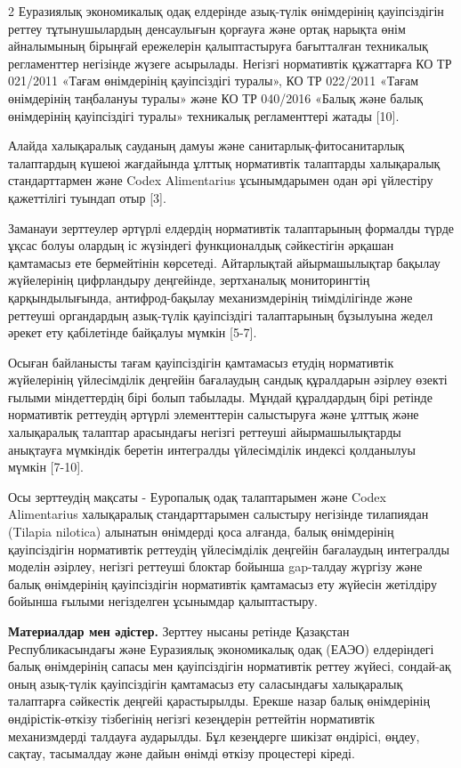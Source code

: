 \begin{multicols}{2}
Еуразиялық экономикалық одақ елдерінде азық-түлік өнімдерінің
қауіпсіздігін реттеу тұтынушылардың денсаулығын қорғауға және ортақ
нарықта өнім айналымының бірыңғай ережелерін қалыптастыруға бағытталған
техникалық регламенттер негізінде жүзеге асырылады. Негізгі нормативтік
құжаттарға КО ТР 021/2011 «Тағам өнімдерінің қауіпсіздігі туралы», КО ТР
022/2011 «Тағам өнімдерінің таңбалануы туралы» және КО ТР 040/2016
«Балық және балық өнімдерінің қауіпсіздігі туралы» техникалық
регламенттері жатады {[}10{]}.

Алайда халықаралық сауданың дамуы және санитарлық-фитосанитарлық
талаптардың күшеюі жағдайында ұлттық нормативтік талаптарды халықаралық
стандарттармен және Codex Alimentarius ұсынымдарымен одан әрі үйлестіру
қажеттілігі туындап отыр {[}3{]}.

Заманауи зерттеулер әртүрлі елдердің нормативтік талаптарының формалды
түрде ұқсас болуы олардың іс жүзіндегі функционалдық сәйкестігін әрқашан
қамтамасыз ете бермейтінін көрсетеді. Айтарлықтай айырмашылықтар бақылау
жүйелерінің цифрландыру деңгейінде, зертханалық мониторингтің
қарқындылығында, антифрод-бақылау механизмдерінің тиімділігінде және
реттеуші органдардың азық-түлік қауіпсіздігі талаптарының бұзылуына
жедел әрекет ету қабілетінде байқалуы мүмкін {[}5-7{]}.

Осыған байланысты тағам қауіпсіздігін қамтамасыз етудің нормативтік
жүйелерінің үйлесімділік деңгейін бағалаудың сандық құралдарын әзірлеу
өзекті ғылыми міндеттердің бірі болып табылады. Мұндай құралдардың бірі
ретінде нормативтік реттеудің әртүрлі элементтерін салыстыруға және
ұлттық және халықаралық талаптар арасындағы негізгі реттеуші
айырмашылықтарды анықтауға мүмкіндік беретін интегралды үйлесімділік
индексі қолданылуы мүмкін {[}7-10{]}.

Осы зерттеудің мақсаты - Еуропалық одақ талаптарымен және Codex
Alimentarius халықаралық стандарттарымен салыстыру негізінде тилапиядан
(Tilapia nilotica) алынатын өнімдерді қоса алғанда, балық өнімдерінің
қауіпсіздігін нормативтік реттеудің үйлесімділік деңгейін бағалаудың
интегралды моделін әзірлеу, негізгі реттеуші блоктар бойынша gap-талдау
жүргізу және балық өнімдерінің қауіпсіздігін нормативтік қамтамасыз ету
жүйесін жетілдіру бойынша ғылыми негізделген ұсынымдар қалыптастыру.

{\bfseries Материалдар мен әдістер.} Зерттеу нысаны ретінде Қазақстан
Республикасындағы және Еуразиялық экономикалық одақ (ЕАЭО) елдеріндегі
балық өнімдерінің сапасы мен қауіпсіздігін нормативтік реттеу жүйесі,
сондай-ақ оның азық-түлік қауіпсіздігін қамтамасыз ету саласындағы
халықаралық талаптарға сәйкестік деңгейі қарастырылды. Ерекше назар
балық өнімдерінің өндірістік-өткізу тізбегінің негізгі кезеңдерін
реттейтін нормативтік механизмдерді талдауға аударылды. Бұл кезеңдерге
шикізат өндірісі, өңдеу, сақтау, тасымалдау және дайын өнімді өткізу
процестері кіреді.


\end{multicols}
